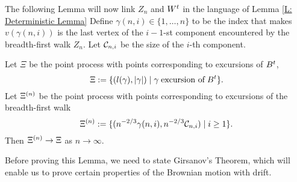 The following Lemma will now link $Z_n$ and $W^t$ in the language of Lemma \ref{L: Deterministic Lemma}
Define $\gamma (n, i) \in \{1, \dots, n\}$ to be the index that makes
$v(\gamma(n,i))$ is the last vertex of the $i-1$-st component encountered by the breadth-first walk $Z_n$.
Let $\mathcal{C}_{n,i}$ be the size of the $i$-th component.

\begin{lemma} \label{L: Lemma 8}
	Let $\Xi$ be the point process with points corresponding to excursions of $B^t$,
	\begin{equation} \label{E: Lemma 8 def Xi}
	\Xi := \{ (l(\gamma), |\gamma|) \; | \; \gamma \; \text{excursion of} \; B^t \}.
	\end{equation}
	Let $\Xi^{(n)}$ be the point process with points corresponding to excursions of the breadth-first walk
	\begin{equation} \label{E: Lemma 8 def Xin}
	\Xi^{(n)} := \{ ( n^{-2 / 3} \gamma(n,i), n^{-2 / 3} \mathcal{C}_{n,i} ) \; | \; i \geq 1 \}.
	\end{equation}
	Then $\Xi^{(n)} \rightarrow \Xi$ as $n \rightarrow \infty$.
\end{lemma}

Before proving this Lemma, we need to state Girsanov's Theorem, 
which will enable us to prove certain properties of the Brownian motion with drift.


